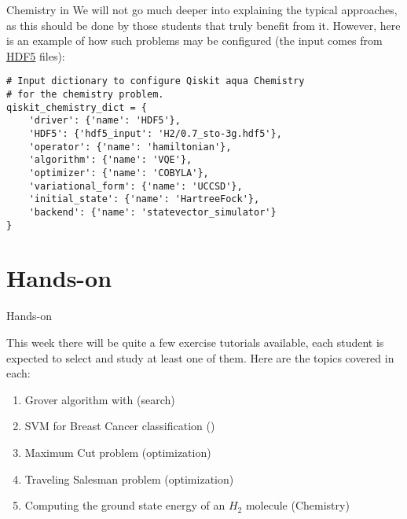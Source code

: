 \documentclass[aspectratio=43]{beamer}
\begin{document}
\begin{frame}[fragile]{Chemistry in \qka}
\small{We will not go much deeper into explaining the typical approaches, as this should be done by those students that truly benefit from it. However, here is an example of how such problems may be configured (the input comes from \href{https://support.hdfgroup.org/HDF5/whatishdf5.html}{HDF5} files):}\begin{verbatim}
# Input dictionary to configure Qiskit aqua Chemistry
# for the chemistry problem.
qiskit_chemistry_dict = {
    'driver': {'name': 'HDF5'},
    'HDF5': {'hdf5_input': 'H2/0.7_sto-3g.hdf5'},
    'operator': {'name': 'hamiltonian'},
    'algorithm': {'name': 'VQE'},
    'optimizer': {'name': 'COBYLA'},
    'variational_form': {'name': 'UCCSD'},
    'initial_state': {'name': 'HartreeFock'},
    'backend': {'name': 'statevector_simulator'}
}
\end{verbatim}
\end{frame}


\section{Hands-on}
\begin{frame}{Hands-on}
\begin{card}
    This week there will be quite a few exercise tutorials available, each student is expected to select and study at least one of them. Here are the topics covered in each:
    \begin{enumerate}
        \item Grover algorithm with \qka (search)
        \item SVM for Breast Cancer classification (\ai)
        \item Maximum Cut problem (optimization)
        \item Traveling Salesman problem (optimization)
        \item Computing the ground state energy of an $H_2$ molecule (Chemistry)
    \end{enumerate}
\end{card}
\end{frame}
\end{document}
